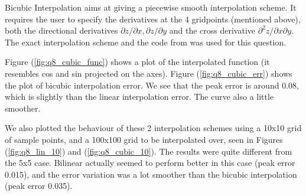 \documentclass[11pt]{article}
\begin{document}
Bicubic Interpolation aims at giving a piecewise smooth interpolation scheme. It requires the user to specify the derivatives at the 4 gridpoints (mentioned above), both the directional derivatives $\partial z/\partial x,\partial z/\partial y$ and the cross derivative $\partial^2 z/\partial x\partial y$. The exact interpolation scheme and the code from \cite{NR} was used for this question.

Figure (\ref{fig:q8_cubic_func}) shows a plot of the interpolated function (it resembles cos and sin projected on the axes). Figure (\ref{fig:q8_cubic_err}) shows the plot of bicubic interpolation error. We see that the peak error is around $0.08$, which is slightly than the linear interpolation error. The curve also a little smoother. 

We also plotted the behaviour of these 2 interpolation schemes using a 10x10 grid of sample points, and a 100x100 grid to be interpolated over, seen in Figures (\ref{fig:q8_lin_10}) and (\ref{fig:q8_cubic_10}). The results were quite different from the 5x5 case. Bilinear actually seemed to perform better in this case (peak error 0.015), and the error variation was a lot smoother than the bicubic interpolation (peak error 0.035). 
\end{document}
